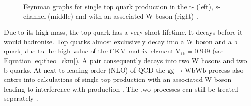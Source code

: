 \begin{figure}[htbp!]
  \begin{center}
\caption{Feynman graphs for single top quark production in the t- (left), s-channel (middle) and with an associated W boson (right) \cite{Husemann:2017eka}. 
  \label{fig:theo_stfeyn}}
  \end{center}
\end{figure}

Due to its high mass, the top quark has a very short lifetime. It decays before it would hadronize.
Top quarks almost exclusively decay into a W boson and a b quark, due to the high value of the CKM matrix element $\mathrm{V}_{\mathrm{tb}} = 0.999$ (see Equation \ref{eq:theo_ckm}).
A \ttbar pair consequently decays into two W bosons and two b quarks. At next-to-leading order (NLO) of QCD the $\mathrm{gg} \rightarrow \mathrm{WbWb}$ process also enters into calculations of single top production with an 
associated W boson leading to interference with \ttbar production \cite{Cascioli:2013wga}. The two processes can still be treated separately \cite{White:2009yt}.

